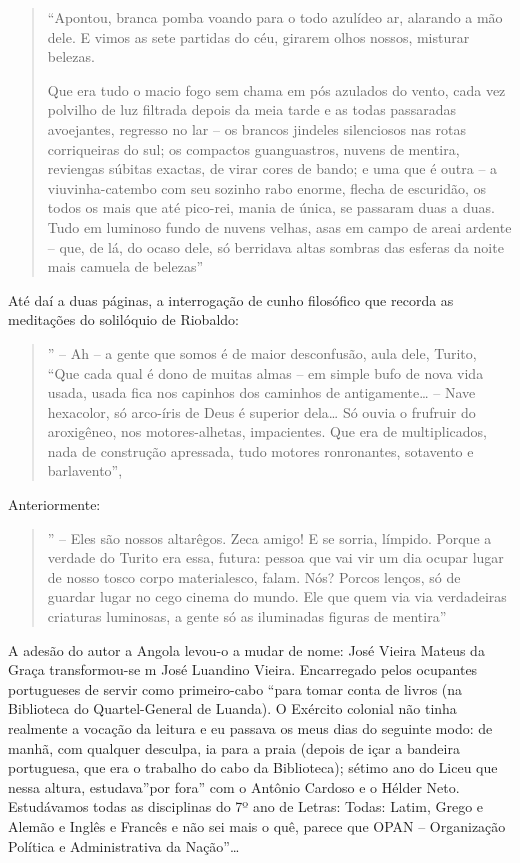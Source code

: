 \documentclass[
  letterpaper,
  DIV=11,
  numbers=noendperiod]{scrreprt}
\begin{document}
\begin{quote}
``Apontou, branca pomba voando para o todo azulídeo ar, alarando a mão
dele. E vimos as sete partidas do céu, girarem olhos nossos, misturar
belezas.

Que era tudo o macio fogo sem chama em pós azulados do vento, cada vez
polvilho de luz filtrada depois da meia tarde e as todas passaradas
avoejantes, regresso no lar -- os brancos jindeles silenciosos nas rotas
corriqueiras do sul; os compactos guanguastros, nuvens de mentira,
reviengas súbitas exactas, de virar cores de bando; e uma que é outra --
a viuvinha-catembo com seu sozinho rabo enorme, flecha de escuridão, os
todos os mais que até pico-rei, mania de única, se passaram duas a duas.
Tudo em luminoso fundo de nuvens velhas, asas em campo de areai ardente
-- que, de lá, do ocaso dele, só berridava altas sombras das esferas da
noite mais camuela de belezas''
\end{quote}

Até daí a duas páginas, a interrogação de cunho filosófico que recorda
as meditações do solilóquio de Riobaldo:

\begin{quote}
'' -- Ah -- a gente que somos é de maior desconfusão, aula dele, Turito,
``Que cada qual é dono de muitas almas -- em simple bufo de nova vida
usada, usada fica nos capinhos dos caminhos de antigamente\ldots{} --
Nave hexacolor, só arco-íris de Deus é superior dela\ldots{} Só ouvia o
frufruir do aroxigêneo, nos motores-alhetas, impacientes. Que era de
multiplicados, nada de construção apressada, tudo motores ronronantes,
sotavento e barlavento'',
\end{quote}

Anteriormente:

\begin{quote}
'' -- Eles são nossos altarêgos. Zeca amigo! E se sorria, límpido.
Porque a verdade do Turito era essa, futura: pessoa que vai vir um dia
ocupar lugar de nosso tosco corpo materialesco, falam. Nós? Porcos
lenços, só de guardar lugar no cego cinema do mundo. Ele que quem via
via verdadeiras criaturas luminosas, a gente só as iluminadas figuras de
mentira''
\end{quote}

A adesão do autor a Angola levou-o a mudar de nome: José Vieira Mateus
da Graça transformou-se m José Luandino Vieira. Encarregado pelos
ocupantes portugueses de servir como primeiro-cabo ``para tomar conta de
livros (na Biblioteca do Quartel-General de Luanda). O Exército colonial
não tinha realmente a vocação da leitura e eu passava os meus dias do
seguinte modo: de manhã, com qualquer desculpa, ia para a praia (depois
de içar a bandeira portuguesa, que era o trabalho do cabo da
Biblioteca); sétimo ano do Liceu que nessa altura, estudava''por fora''
com o Antônio Cardoso e o Hélder Neto. Estudávamos todas as disciplinas
do 7º ano de Letras: Todas: Latim, Grego e Alemão e Inglês e Francês e
não sei mais o quê, parece que OPAN -- Organização Política e
Administrativa da Nação''\ldots{}
\end{document}
